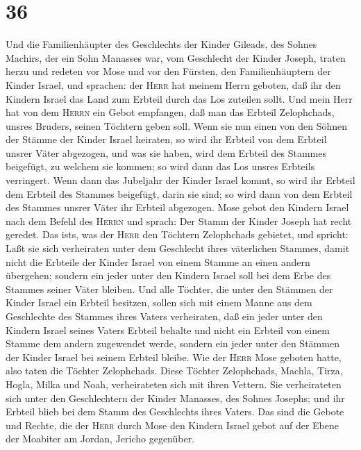 \hypertarget{section-35}{%
\section{36}\label{section-35}}

 Und die Familienhäupter des Geschlechts der Kinder
Gileads, des Sohnes Machirs, der ein Sohn Manasses war, vom Geschlecht
der Kinder Joseph, traten herzu und redeten vor Mose und vor den
Fürsten, den Familienhäuptern der Kinder Israel, und sprachen:
 der \textsc{Herr} hat meinem Herrn geboten, daß ihr den
Kindern Israel das Land zum Erbteil durch das Los zuteilen sollt. Und
mein Herr hat von dem \textsc{Herrn} ein Gebot empfangen, daß man das
Erbteil Zelophchads, unsres Bruders, seinen Töchtern geben soll.
 Wenn sie nun einen von den Söhnen der Stämme der Kinder
Israel heiraten, so wird ihr Erbteil von dem Erbteil unsrer Väter
abgezogen, und was sie haben, wird dem Erbteil des Stammes beigefügt, zu
welchem sie kommen; so wird dann das Los unsres Erbteils verringert.
 Wenn dann das Jubeljahr der Kinder Israel kommt, so wird
ihr Erbteil dem Erbteil des Stammes beigefügt, darin sie sind; so wird
dann von dem Erbteil des Stammes unsrer Väter ihr Erbteil abgezogen.
 Mose gebot den Kindern Israel nach dem Befehl des
\textsc{Herrn} und sprach: Der Stamm der Kinder Joseph hat recht
geredet.  Das ist\textquotesingle s, was der \textsc{Herr}
den Töchtern Zelophchads gebietet, und spricht: Laßt sie sich
verheiraten unter dem Geschlecht ihres väterlichen Stammes,
 damit nicht die Erbteile der Kinder Israel von einem
Stamme an einen andern übergehen; sondern ein jeder unter den Kindern
Israel soll bei dem Erbe des Stammes seiner Väter bleiben.
 Und alle Töchter, die unter den Stämmen der Kinder Israel
ein Erbteil besitzen, sollen sich mit einem Manne aus dem Geschlechte
des Stammes ihres Vaters verheiraten, daß ein jeder unter den Kindern
Israel seines Vaters Erbteil behalte  und nicht ein
Erbteil von einem Stamme dem andern zugewendet werde, sondern ein jeder
unter den Stämmen der Kinder Israel bei seinem Erbteil bleibe.
 Wie der \textsc{Herr} Mose geboten hatte, also taten die
Töchter Zelophchads.  Diese Töchter Zelophchads, Machla,
Tirza, Hogla, Milka und Noah, verheirateten sich mit ihren Vettern.
 Sie verheirateten sich unter den Geschlechtern der
Kinder Manasses, des Sohnes Josephs; und ihr Erbteil blieb bei dem Stamm
des Geschlechts ihres Vaters.  Das sind die Gebote und
Rechte, die der \textsc{Herr} durch Mose den Kindern Israel gebot auf
der Ebene der Moabiter am Jordan, Jericho gegenüber.
